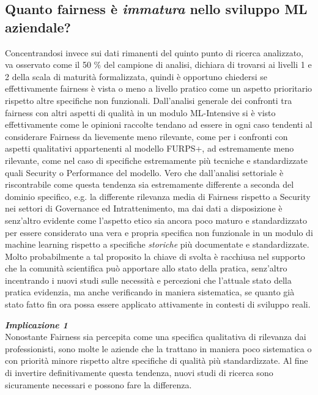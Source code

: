    \subsection{Quanto fairness è \emph{immatura} nello sviluppo ML aziendale?}
   Concentrandosi invece sui dati rimanenti del quinto punto di ricerca analizzato, va osservato come il 50 \% del campione di analisi, dichiara di trovarsi ai livelli 1 e 2 della scala di maturità formalizzata, quindi è opportuno chiedersi se effettivamente fairness è vista o meno a livello pratico come un aspetto prioritario rispetto altre specifiche non funzionali. Dall'analisi generale dei confronti tra fairness con altri aspetti di qualità in un modulo ML-Intensive si è visto effettivamente come le opinioni raccolte tendano ad essere in ogni caso tendenti al considerare Fairness da lievemente meno rilevante, come per i confronti con aspetti qualitativi appartenenti al modello FURPS+, ad estremamente meno rilevante, come nel caso di specifiche estremamente più tecniche e standardizzate quali Security o Performance del modello. Vero che dall'analisi settoriale è riscontrabile come questa tendenza sia estremamente differente a seconda del dominio specifico, e.g. la differente rilevanza media di Fairness rispetto a Security nei settori di Governance ed Intrattenimento, ma dai dati a disposizione è senz'altro evidente come l'aspetto etico sia ancora poco maturo e standardizzato per essere considerato una vera e propria specifica non funzionale in un modulo di machine learning rispetto a specifiche \emph{storiche} più documentate e standardizzate. Molto probabilmente a tal proposito la chiave di svolta è racchiusa nel supporto che la comunità scientifica può apportare allo stato della pratica, senz'altro incentrando i nuovi studi sulle necessità e percezioni che l'attuale stato della pratica evidenzia, ma anche verificando in maniera sistematica, se quanto già stato fatto fin ora possa essere applicato attivamente in contesti di sviluppo reali.
   
     \begin{center}
	
        \begin{tcolorbox}[width=\textwidth, colframe=black, colback=perla]
    			\begin{minipage}{\textwidth}
    				\textit{\faCaretSquareORight  \textbf{ Implicazione 1}}\\
    		     Nonostante Fairness sia percepita come una specifica qualitativa di rilevanza dai professionisti, sono molte le aziende che la trattano in maniera poco sistematica o con priorità minore rispetto altre specifiche di qualità più standardizzate. Al fine di invertire definitivamente questa tendenza, nuovi studi di ricerca sono sicuramente necessari e possono fare la differenza.
    			\end{minipage}
		\end{tcolorbox}
	\end{center}
    
